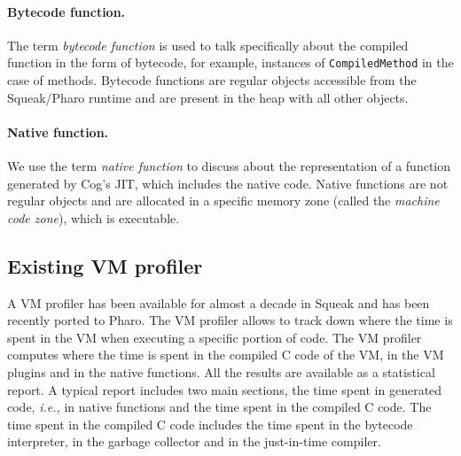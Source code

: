 \documentclass[10pt,preprint]{sigplanconf}
\newcommand{\ct}{\lstinline[backgroundcolor=\color{white},basicstyle=\footnotesize\ttfamily]}
\newcommand{\ie}{\emph{i.e.,}\xspace}
\begin{document}
\paragraph{Bytecode function.} The term \emph{bytecode function} is used to talk specifically about the compiled function in the form of bytecode, for example, instances of \ct{CompiledMethod} in the case of methods. Bytecode functions are regular objects accessible from the Squeak/Pharo runtime and are present in the heap with all other objects.

\paragraph{Native function.} We use the term \emph{native function} to discuss about the representation of a function generated by Cog's JIT, which includes the native code. Native functions are not regular objects and are allocated in a specific memory zone (called the \emph{machine code zone}), which is executable.

\subsection{Existing VM profiler}

A VM profiler has been available for almost a decade in Squeak and has been recently ported to Pharo. The VM profiler allows to track down where the time is spent in the VM when executing a specific portion of code. The VM profiler computes where the time is spent in the compiled C code of the VM, in the VM plugins and in the native functions. All the results are available as a statistical report. A typical report includes two main sections, the time spent in generated code, \ie in native functions and the time spent in the compiled C code. The time spent in the compiled C code includes the time spent in the bytecode interpreter, in the garbage collector and in the just-in-time compiler. 

\end{document}
